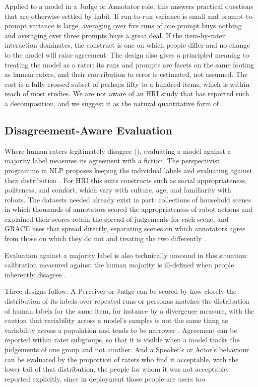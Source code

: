 Applied to a model in a Judge or Annotator role, this answers practical
questions that are otherwise settled by habit. If run-to-run variance is
small and prompt-to-prompt variance is large, averaging over five runs of one
prompt buys nothing and averaging over three prompts buys a great deal. If
the item-by-rater interaction dominates, the construct is one on which people
differ and no change to the model will raise agreement. The design also
gives a principled meaning to treating the model as a rater: its runs and
prompts are facets on the same footing as human raters, and their
contribution to error is estimated, not assumed. The cost is a fully crossed
subset of perhaps fifty to a hundred items, which is within reach of most
studies. We are not aware of an HRI study that has reported such a
decomposition, and we suggest it as the natural quantitative form of
.

\subsection{Disagreement-Aware Evaluation}
\label{sec:perspectivist}

Where human raters legitimately disagree (), evaluating a model
against a majority label measures its agreement with a fiction. The
perspectivist programme in NLP proposes keeping the individual labels and
evaluating against their distribution
\cite{plank2022problem,cabitza2023toward,uma2021learning}. For HRI this suits
constructs such as social appropriateness, politeness, and comfort, which
vary with culture, age, and familiarity with robots. The datasets needed
already exist in part: collections of household scenes in which thousands of
annotators scored the appropriateness of robot actions and explained their
scores retain the spread of judgements for each scene, and GRACE uses that
spread directly, separating scenes on which annotators agree from those on
which they do not and treating the two differently \cite{dogan2025grace}.

Evaluation against a majority label is also technically unsound in
this situation: calibration measured against the human majority is
ill-defined when people inherently disagree \cite{baan2022stop}.

Three designs follow. A Perceiver or Judge can be scored by how closely the
distribution of its labels over repeated runs or personas matches the
distribution of human labels for the same item, for instance by a divergence
measure, with the caution that variability across a model's samples is not
the same thing as variability across a population and tends to be narrower
\cite{bisbee2024synthetic,wang2025large}. Agreement can be reported within
rater subgroups, so that it is visible when a model tracks the judgements of
one group and not another. And a Speaker's or Actor's behaviour can be
evaluated by the proportion of raters who find it acceptable, with the lower
tail of that distribution, the people for whom it was not acceptable,
reported explicitly, since in deployment those people are users too.

